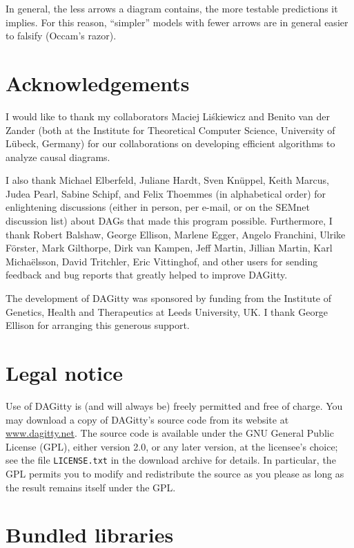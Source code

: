 \documentclass[a4paper,10pt]{article}
\newcommand{\pname}{{\sc DAG}itty\xspace}
\begin{document}
In general, the less arrows a diagram contains, the more testable
predictions it implies. For this reason, ``simpler'' models with
fewer arrows are in general easier to falsify (Occam's razor).


\section{Acknowledgements}

I would like to thank my collaborators Maciej Li\'skiewicz
and Benito van der Zander (both at the Institute for Theoretical Computer Science,
University of L\"ubeck, Germany) for our collaborations on developing efficient algorithms
to analyze causal diagrams.  

I also thank Michael Elberfeld, Juliane Hardt, 
Sven Kn\"{u}ppel, Keith Marcus, Judea Pearl, Sabine Schipf, 
and Felix Thoemmes (in alphabetical order) for enlightening discussions
(either in person, per e-mail, or on the SEMnet discussion list)
about DAGs that made this program possible. Furthermore, I thank
Robert Balshaw, George Ellison, 
Marlene Egger, Angelo Franchini,  Ulrike F\"{o}rster, Mark Gilthorpe, 
Dirk van Kampen,
Jeff Martin, Jillian Martin, Karl Micha\"{e}lsson,
David Tritchler, Eric Vittinghof, 
and other users for sending feedback and bug reports that greatly
helped to improve \pname. 

The development of DAGitty was sponsored by funding from the 
Institute of Genetics, Health and Therapeutics at Leeds
University, UK. I thank George Ellison for arranging this
generous support.

\section{Legal notice}

Use of \pname is (and will always be) freely permitted and free of charge. 
You may download a copy of \pname's source code from its website at \url{www.dagitty.net}.
The source code is available under the GNU General Public License (GPL),
either version 2.0, or any later version, at the licensee's choice;
see the file \verb|LICENSE.txt| in the download archive for details.
In particular, the GPL permits you to  modify and redistribute the source
as you please as long as the result remains itself under the GPL.

\section{Bundled libraries}
\end{document}
